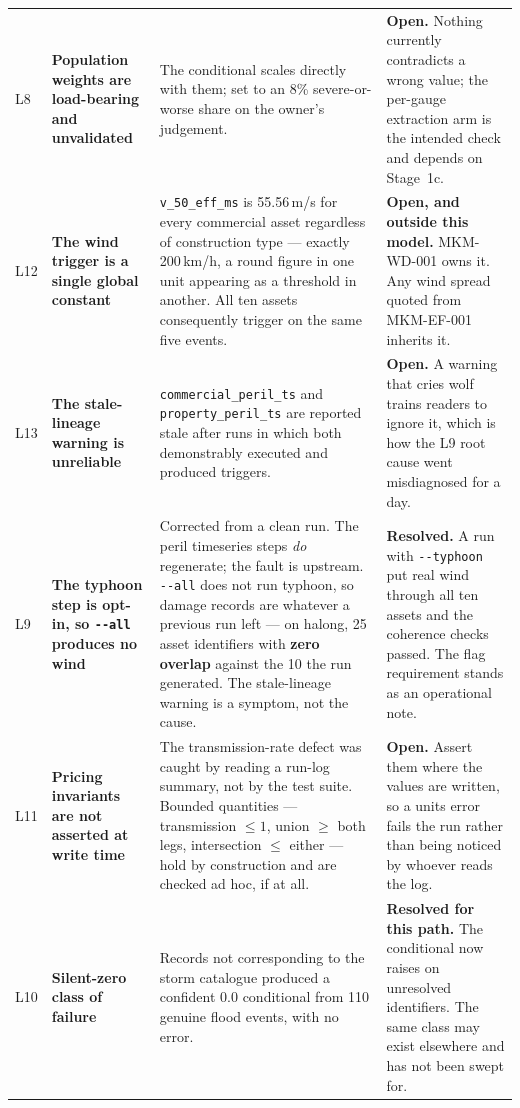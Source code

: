 \documentclass[11pt]{article}
\begin{document}
\begin{longtable}{@{}p{}p{}p{}p{}@{}}
\addlinespace
L8 & \textbf{Population weights are load-bearing and unvalidated} & The
conditional scales directly with them; set to an 8\% severe-or-worse share on
the owner's judgement. & \textbf{Open.} Nothing currently contradicts a wrong
value; the per-gauge extraction arm is the intended check and depends on
Stage~1c. \\
\addlinespace
L12 & \textbf{The wind trigger is a single global constant} &
\texttt{v\_50\_eff\_ms} is 55.56\,m/s for every commercial asset regardless of
construction type --- exactly 200\,km/h, a round figure in one unit appearing as
a threshold in another. All ten assets consequently trigger on the same five
events. & \textbf{Open, and outside this model.} MKM-WD-001 owns it. Any wind
spread quoted from MKM-EF-001 inherits it. \\
\addlinespace
L13 & \textbf{The stale-lineage warning is unreliable} &
\texttt{commercial\_peril\_ts} and \texttt{property\_peril\_ts} are reported
stale after runs in which both demonstrably executed and produced triggers. &
\textbf{Open.} A warning that cries wolf trains readers to ignore it, which is
how the L9 root cause went misdiagnosed for a day. \\
\addlinespace
L9 & \textbf{The typhoon step is opt-in, so \texttt{-{}-all} produces no wind}
& Corrected from a clean run. The peril timeseries steps \emph{do} regenerate;
the fault is upstream. \texttt{-{}-all} does not run typhoon, so damage records
are whatever a previous run left --- on halong, 25 asset identifiers with
\textbf{zero overlap} against the 10 the run generated. The stale-lineage
warning is a symptom, not the cause. & \textbf{Resolved.} A run with
\texttt{-{}-typhoon} put real wind through all ten assets and the coherence
checks passed. The flag requirement stands as an operational note. \\
\addlinespace
L11 & \textbf{Pricing invariants are not asserted at write time} & The
transmission-rate defect was caught by reading a run-log summary, not by the
test suite. Bounded quantities --- transmission $\leq 1$, union $\geq$ both
legs, intersection $\leq$ either --- hold by construction and are checked ad
hoc, if at all. & \textbf{Open.} Assert them where the values are written, so a
units error fails the run rather than being noticed by whoever reads the log. \\
\addlinespace
L10 & \textbf{Silent-zero class of failure} & Records not corresponding to the
storm catalogue produced a confident 0.0 conditional from 110 genuine flood
events, with no error. & \textbf{Resolved for this path.} The conditional now
raises on unresolved identifiers. The same class may exist elsewhere and has not
been swept for. \\
\bottomrule
\end{longtable}
\end{document}
